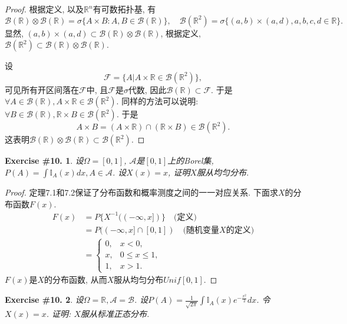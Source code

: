 \documentclass[UTF8, a4paper]{article}
\newtheorem{exercise}{Exercise \#10.}
\begin{document}
\begin{proof}
根据定义, 以及\(\mathbb{R}^n\)有可数拓扑基, 有
$$
\mathcal{B}(\mathbb{R}) \otimes \mathcal{B}(\mathbb{R}) = \sigma\{A\times B: A, B \in \mathcal{B}(\mathbb{R})\}, \quad \mathcal{B}(\mathbb{R}^2) = \sigma\{(a,b) \times (a,d), a,b,c,d \in \mathbb{R}\}.
$$
显然, \((a,b) \times (a,d) \subset \mathcal{B}(\mathbb{R}) \otimes \mathcal{B}(\mathbb{R})\), 根据定义, \(\mathcal{B}(\mathbb{R}^2) \subset \mathcal{B}(\mathbb{R}) \otimes \mathcal{B}(\mathbb{R})\).

设
$$
\mathcal{F} = \{A | A \times \mathbb{R} \in \mathcal{B}(\mathbb{R}^2)\},
$$
可见所有开区间落在\(\mathcal{F}\)中, 且\(\mathcal{F}\)是\(\sigma\)代数, 因此\(\mathcal{B}(\mathbb{R}) \subset \mathcal{F}\).
于是\(\forall A \in \mathcal{B}(\mathbb{R}), A\times \mathbb{R} \in \mathcal{B}(\mathbb{R}^2)\).
同样的方法可以说明: \(\forall B \in \mathcal{B}(\mathbb{R}), \mathbb{R}\times B \in \mathcal{B}(\mathbb{R}^2)\).
于是
$$
A \times B = (A \times \mathbb{R}) \cap (\mathbb{R} \times B) \in \mathcal{B}(\mathbb{R}^2).
$$
这表明\(\mathcal{B}(\mathbb{R}) \otimes \mathcal{B}(\mathbb{R}) \subset \mathcal{B}(\mathbb{R}^2)\).
\end{proof}

\begin{framed}
\begin{exercise}
设\(\Omega = [0, 1]\), \(\mathcal{A}\)是\([0,1]\)上的Borel集, 
\(P(A) = \int \mathbb{I}_A(x)dx, A \in \mathcal{A}\).
设\(X(x) = x\), 证明\(X\)服从均匀分布.
\end{exercise}
\end{framed}

\begin{proof}
定理7.1和7.2保证了分布函数和概率测度之间的一一对应关系.
下面求\(X\)的分布函数\(F(x)\).
$$
\begin{aligned}
    F(x) &= P\{X^{-1}((-\infty, x])\} \quad \text{(定义)} \\
    &= P((-\infty, x]\cap [0,1]) \quad \text{(随机变量\(X\)的定义)} \\
    &= \begin{cases}
        0, & x<0, \\
        x, & 0\leq x \leq 1, \\
        1, & x>1.
    \end{cases}
\end{aligned}
$$
\(F(x)\)是\(X\)的分布函数, 从而\(X\)服从均匀分布\(Unif[0,1]\).
\end{proof}

\begin{framed}
\begin{exercise}
设\(\Omega = \mathbb{R}, \mathcal{A} = \mathcal{B}\).
设\(P(A) = \frac{1}{\sqrt{2\pi}} \int \mathbb{I}_A(x)e^{-\frac{x^2}{2}} dx\).
令\(X(x) = x\).
证明: \(X\)服从标准正态分布.
\end{exercise}
\end{framed}
\end{document}
